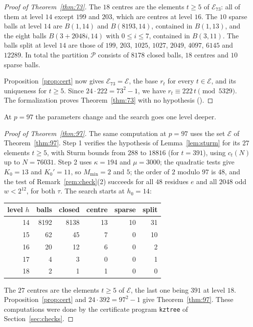 \documentclass[12pt]{amsart}
\theoremstyle{definition}
\newcommand{\cE}{\mathcal{E}}
\newcommand{\B}{B}
\begin{document}
\begin{proof}[Proof of Theorem~\ref{thm:73}]
The $18$ centres are the elements $t\ge5$ of $\cE_{73}$: all of them at level $14$ except $199$ and $203$, which are centres at level $16$. The $10$ sparse balls at level $14$ are $\B(1,14)$ and $\B(8193,14)$, contained in $\B(1,13)$, and the eight balls $\B(3+2048i,14)$ with $0\le i\le7$, contained in $\B(3,11)$. The balls split at level $14$ are those of $199$, $203$, $1025$, $1027$, $2049$, $4097$, $6145$ and $12289$. In total the partition $\mathcal{P}$ consists of $8178$ closed balls, $18$ centres and $10$ sparse balls.

Proposition~\ref{prop:cert} now gives $\cE_{73}=\cE$, the base $r_t$ for every $t\in\cE$, and its uniqueness for $t\ge5$. Since $24\cdot222=73^2-1$, we have $r_t\equiv222\,t\pmod{5329}$. The formalization proves Theorem~\ref{thm:73} with no hypothesis ().
\end{proof}

At $p=97$ the parameters change and the search goes one level deeper.

\begin{proof}[Proof of Theorem~\ref{thm:97}]
The same computation at $p=97$ uses the set $\cE$ of Theorem~\ref{thm:97}. Step 1 verifies the hypothesis of Lemma~\ref{lem:sturm} for its $27$ elements $t\ge5$, with Sturm bounds from $288$ to $18816$ (for $t=391$), using $c_t(N)$ up to $N=76031$. Step 2 uses $\kappa=194$ and $\mu=3000$; the quadratic tests give $K_0=13$ and $K_0'=11$, so $M_{\min}=2$ and $5$; the order of $2$ modulo $97$ is $48$, and the test of Remark~\ref{rem:check}(2) succeeds for all $48$ residues $e$ and all $2048$ odd $w<2^{12}$, for both $\tau$. The search starts at $h_0=14$:

\begin{center}
\begin{tabular}{rrrrrr}
\hline
level $h$ & balls & closed & centre & sparse & split\\
\hline
14 & 8192 & 8138 & 13 & 10 & 31\\
15 & 62 & 45 & 7 & 0 & 10\\
16 & 20 & 12 & 6 & 0 & 2\\
17 & 4 & 3 & 0 & 0 & 1\\
18 & 2 & 1 & 1 & 0 & 0\\
\hline
\end{tabular}
\end{center}

\noindent The $27$ centres are the elements $t\ge5$ of $\cE$, the last one being $391$ at level $18$. Proposition~\ref{prop:cert} and $24\cdot392=97^2-1$ give Theorem~\ref{thm:97}. These computations were done by the certificate program \texttt{kztree} of Section~\ref{sec:checks}.
\end{proof}
\end{document}
